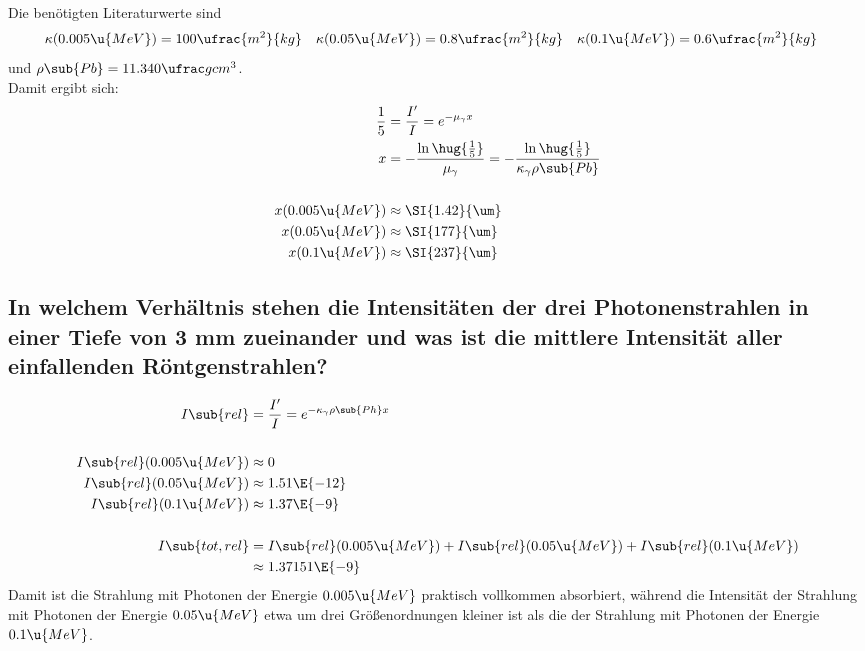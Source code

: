 \documentclass[ex, minted]{exercise_4.1}
\begin{document}
\dottedlinett

Die benötigten Literaturwerte sind
\begin{align*}
    \kappa(0.005\u{MeV}) &= 100 \ufrac{m^2}{kg}&
    \kappa(0.05\u{MeV}) &= 0.8\ufrac{m^2}{kg}&
    \kappa(0.1\u{MeV}) &= 0.6\ufrac{m^2}{kg}
\end{align*}
und $\rho\sub{Pb} = 11.340 \ufrac g{cm^3}$.\\

Damit ergibt sich:
\begin{align*}
    \frac 15 &= \frac {I'}I = e^{-\mu_\gamma x}\\
    x &= -\frac{\ln\hug{\frac15}}{\mu_\gamma}
    = -\frac{\ln\hug{\frac15}}{\kappa_\gamma \rho\sub{Pb}}\\
    \\
    x(0.005\u{MeV}) &\approx \SI{1.42}{\um}\\
    x(0.05\u{MeV}) &\approx \SI{177}{\um}\\
    x(0.1\u{MeV}) &\approx \SI{237}{\um}
\end{align*}

\subsection{In welchem Verhältnis stehen die Intensitäten der drei Photonenstrahlen in einer Tiefe von 3 mm zueinander und was ist die mittlere Intensität aller einfallenden Röntgenstrahlen?}

\dottedlinete

\begin{align*}
    I\sub{rel} &= \frac {I'}I = e^{-\kappa_\gamma\rho\sub{Ph} x}\\\
    \\
    I\sub{rel}(0.005\u{MeV}) &\approx 0\\
    I\sub{rel}(0.05\u{MeV}) &\approx 1.51\E{-12}\\
    I\sub{rel}(0.1\u{MeV}) &\approx 1.37\E{-9}\\
    \\
    I\sub{tot,rel}&=I\sub{rel}(0.005\u{MeV}) + I\sub{rel}(0.05\u{MeV}) + I\sub{rel}(0.1\u{MeV})\\
    &\approx  1.37151\E{-9}
\end{align*}
Damit ist die Strahlung mit Photonen der Energie \(0.005\u{MeV}\) praktisch vollkommen absorbiert, während die Intensität der Strahlung mit Photonen der Energie \(0.05\u{MeV}\) etwa um drei Größenordnungen kleiner ist als die der Strahlung mit Photonen der Energie \(0.1\u{MeV}\). 
\end{document}
